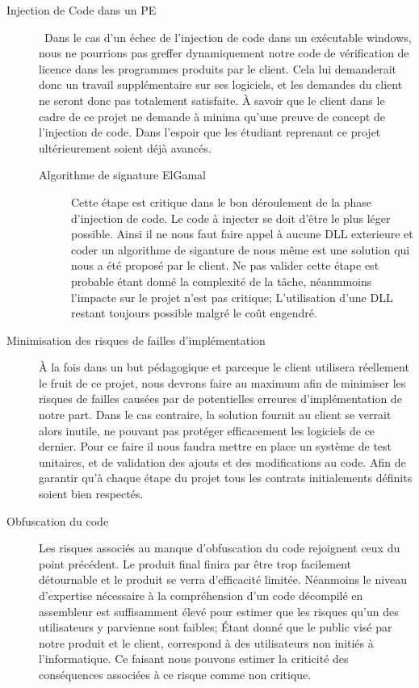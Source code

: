 \begin{description}

    \item[Injection de Code dans un PE]\
	Dans le cas d'un échec de l'injection de code dans un exécutable windows, nous ne pourrions pas greffer dynamiquement
	notre code de vérification de licence dans les programmes produits par le client. Cela lui demanderait donc un travail 
	supplémentaire sur ses logiciels, et les demandes du client ne seront donc pas totalement satisfaite.
	À savoir que le client dans le cadre de ce projet ne demande à minima qu'une preuve de concept de l'injection de code.
	Dans l'espoir que les étudiant reprenant ce projet ultérieurement soient déjà avancés.
		
        \begin{description}
            \item[Algorithme de signature ElGamal]
			Cette étape est critique dans le bon déroulement de la phase d'injection de code. Le code à injecter se doit d'être 
			le plus léger possible. Ainsi il ne nous faut faire appel à aucune DLL exterieure et coder un algorithme de siganture de nous
			même est une solution qui nous a été proposé par le client. Ne pas valider cette étape est probable étant donné
			la complexité de la tâche, néanmmoins l'impacte sur le projet n'est pas critique; L'utilisation d'une DLL restant
			toujours possible malgré le coût engendré.\newline
		\end{description}

    \item[Minimisation des risques de failles d'implémentation]
	À la fois dans un but pédagogique et parceque le client utilisera réellement le fruit de ce projet, nous devrons
	faire au maximum afin de minimiser les risques de failles causées par de potentielles erreures d'implémentation de notre part.
	Dans le cas contraire, la solution fournit au client se verrait alors inutile, ne pouvant pas protéger efficacement les logiciels
	de ce dernier. 
	Pour ce faire il nous faudra mettre en place un système de test unitaires, et de validation des ajouts et des modifications au code.
	Afin de garantir qu'à chaque étape du projet tous les contrats initialements définits soient bien respectés.\newline

\item[Obfuscation du code]
	Les risques associés au manque d'obfuscation du code rejoignent ceux du point précédent. Le produit final finira par être trop facilement
	détournable et le produit se verra d'efficacité limitée. Néanmoins le niveau d'expertise nécessaire à la compréhension d'un code décompilé 
	en assembleur est suffisamment élevé pour estimer que les risques qu'un des utilisateurs y parvienne sont faibles; Étant donné que le public
	visé par notre produit et le client, correspond à des utilisateurs non initiés à l'informatique. Ce faisant nous pouvons estimer la criticité 
	des conséquences associées à ce risque comme non critique.\newline


\end{description}
